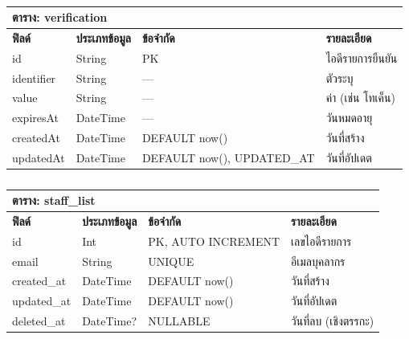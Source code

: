 \begin{table}[htbp]
    \caption{}\label{tab3:verification_fields}
    \centering
    \renewcommand{\arraystretch}{1.2}
    \small
    \begin{tabular}{p{} p{} p{} p{}}
        \hline
        \multicolumn{4}{l}{\textbf{ตาราง: verification}} \\
        \hline
            \textbf{ฟิลด์} & \textbf{ประเภทข้อมูล} & \textbf{ข้อจำกัด} & \textbf{รายละเอียด} \\
        \hline
        id & String & PK & ไอดีรายการยืนยัน \\
        identifier & String & — & ตัวระบุ \\
        value & String & — & ค่า (เช่น โทเค็น) \\
        expiresAt & DateTime & — & วันหมดอายุ \\
        createdAt & DateTime & DEFAULT now() & วันที่สร้าง \\
        updatedAt & DateTime & DEFAULT now(), UPDATED\_AT & วันที่อัปเดต \\
        \hline
    \end{tabular}
\end{table}

\begin{table}[htbp]
    \caption{}\label{tab3:staff_list_fields}
    \centering
    \renewcommand{\arraystretch}{1.2}
    \small
    \begin{tabular}{p{} p{} p{} p{}}
        \hline
        \multicolumn{4}{l}{\textbf{ตาราง: staff\_list}} \\
        \hline
            \textbf{ฟิลด์} & \textbf{ประเภทข้อมูล} & \textbf{ข้อจำกัด} & \textbf{รายละเอียด} \\
        \hline
        id & Int & PK, AUTO INCREMENT & เลขไอดีรายการ \\
        email & String & UNIQUE & อีเมลบุคลากร \\
        created\_at & DateTime & DEFAULT now() & วันที่สร้าง \\
        updated\_at & DateTime & DEFAULT now() & วันที่อัปเดต \\
        deleted\_at & DateTime? & NULLABLE & วันที่ลบ (เชิงตรรกะ) \\
        \hline
    \end{tabular}
\end{table}

